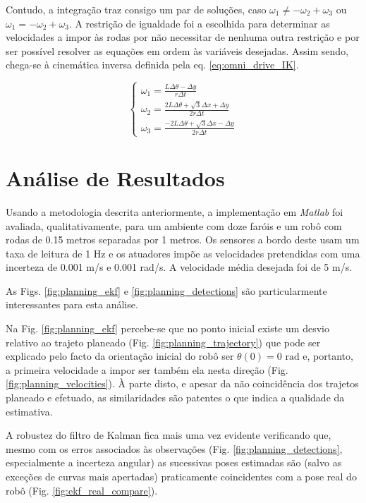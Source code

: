\documentclass[twocolumn]{article}
\begin{document}
Contudo, a integração traz consigo um par de soluções, caso $\omega_1 \neq -\omega_2 + \omega_3$ ou $\omega_1 = -\omega_2 + \omega_3$. A restrição de igualdade foi a escolhida para determinar as velocidades a impor às rodas por não necessitar de nenhuma outra restrição e por ser possível resolver as equações em ordem às variáveis desejadas. Assim sendo, chega-se à cinemática inversa definida pela eq. \ref{eq:omni_drive_IK}.

\begin{equation}
    \begin{cases}
        \omega_{1} = \frac{L \Delta \theta - \Delta y}{r \Delta t} \\
        \omega_{2} = \frac{2 L \Delta \theta + \sqrt{3} \Delta x + \Delta y}{2 r \Delta t} \\
        \omega_{3} = \frac{- 2 L \Delta \theta + \sqrt{3} \Delta x - \Delta y}{2 r \Delta t}
    \end{cases}
    \label{eq:omni_drive_IK}
\end{equation}

\section{Análise de Resultados}

Usando a metodologia descrita anteriormente, a implementação em \textit{Matlab} foi avaliada, qualitativamente, para um ambiente com doze faróis e um robô com rodas de 0.15 metros separadas por 1 metros. Os sensores a bordo deste usam um taxa de leitura de 1 Hz e os atuadores impõe as velocidades pretendidas com uma incerteza de 0.001 m/s e 0.001 rad/s. A velocidade média desejada foi de 5 m/s.

As Figs. \ref{fig:planning_ekf} e \ref{fig:planning_detections} são particularmente interessantes para esta análise. 

Na Fig. \ref{fig:planning_ekf} percebe-se que no ponto inicial existe um desvio relativo ao trajeto planeado (Fig. \ref{fig:planning_trajectory}) que pode ser explicado pelo facto da orientação inicial do robô ser $\theta(0) = 0 \text{ rad}$ e, portanto, a primeira velocidade a impor ser também ela nesta direção (Fig. \ref{fig:planning_velocities}). À parte disto, e apesar da não coincidência dos trajetos planeado e efetuado, as similaridades são patentes o que indica a qualidade da estimativa.

A robustez do filtro de Kalman fica mais uma vez evidente verificando que, mesmo com os erros associados às observações (Fig. \ref{fig:planning_detections}, especialmente a incerteza angular) as sucessivas poses estimadas são (salvo as exceções de curvas mais apertadas) praticamente coincidentes com a pose real do robô (Fig. \ref{fig:ekf_real_compare}).
\end{document}
